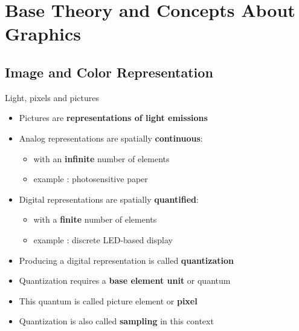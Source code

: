 \section{Base Theory and Concepts About Graphics}

\subsection{Image and Color Representation}

\begin{frame}{Light, pixels and pictures}
  \begin{itemize}
  \item Pictures are {\bf representations of light emissions}
  \item Analog representations are spatially {\bf continuous}:
    \begin{itemize}
    \item with an {\bf infinite} number of elements
    \item example : photosensitive paper
    \end{itemize}
  \item Digital representations are spatially {\bf quantified}:
    \begin{itemize}
    \item with a {\bf finite} number of elements
    \item example : discrete LED-based display
    \end{itemize}
  \item Producing a digital representation is called \textbf{quantization}
  \item Quantization requires a {\bf base element unit} or quantum
  \item This quantum is called picture element or {\bf pixel}
  \item Quantization is also called \textbf{sampling} in this context
  \end{itemize}
\end{frame}

